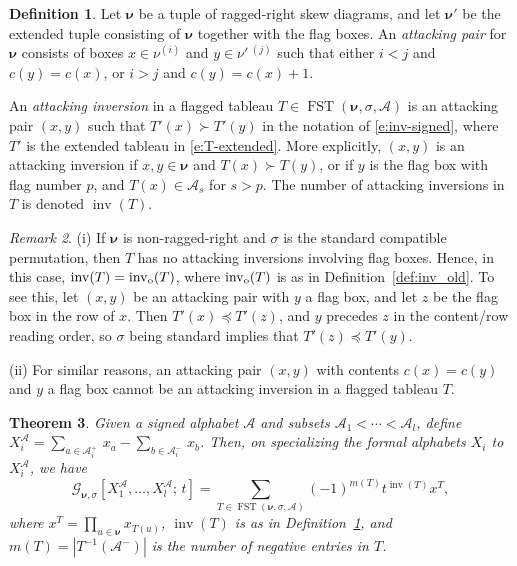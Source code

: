 \documentclass[12pt]{amsart}
\newtheorem{thm}{Theorem}[subsection]
\theoremstyle{definition}
\newtheorem{defn}[thm]{Definition}
\theoremstyle{remark}
\newtheorem{remark}[thm]{Remark}
\newcommand{\nubold}{{\boldsymbol \nu }}
\newcommand{\Acal}{{\mathcal A}}
\newcommand{\Gcal}{{\mathcal G}}
\newcommand{\sgngt}{\succ}
\newcommand{\sgnle}{\preccurlyeq}
\DeclareMathOperator{\inv}{inv}
\newcommand{\oinv}{\inv _{{\rm o}}}
\DeclareMathOperator{\FSST}{FST}
\begin{document}
\begin{defn}\label{def:inversions}
Let $\nubold $ be a tuple of ragged-right skew diagrams, and let
$\nubold '$ be the extended tuple consisting of $\nubold $ together
with the flag boxes.  An {\em attacking pair} for $\nubold $ consists
of boxes $x\in \nu ^{(i)}$ and $y\in \nu '\, ^{(j)}$ such that either
$i<j$ and $c(y) = c(x)$, or $i>j$ and $c(y) = c(x)+1$.


An {\em attacking inversion} in a flagged tableau $T\in \FSST (\nubold
, \sigma ,\Acal )$ is an attacking pair $(x,y)$ such that $T'(x)
\sgngt T'(y)$ in the notation of \eqref{e:inv-signed}, where $T'$ is
the extended tableau in \eqref{e:T-extended}.  More explicitly,
$(x,y)$ is an attacking inversion if $x, y\in \nubold $ and $T(x)
\sgngt T(y)$, or if $y$ is the flag box with flag number $p$, and
$T(x)\in \Acal _{s}$ for $s>p$.  The number of attacking inversions in
$T$ is denoted $\inv (T)$.
\end{defn}

\begin{remark}\label{rem:no-funny-inv}
(i) If $\nubold $ is non-ragged-right and $\sigma $ is the standard
compatible permutation, then $T$ has no attacking inversions involving
flag boxes.  Hence, in this case, $\inv (T) = \oinv (T)$, where $\oinv
(T)$ is as in Definition~\ref{def:inv_old}.  To see this, let $(x,y)$
be an attacking pair with $y$ a flag box, and let $z$ be the flag box
in the row of $x$.  Then $T'(x)\sgnle T'(z)$, and $y$ precedes $z$ in
the content/row reading order, so $\sigma $ being standard implies
that $T'(z)\sgnle T'(y)$.

(ii) For similar reasons, an attacking pair $(x,y)$ with contents
$c(x)=c(y)$ and $y$ a flag box cannot be an attacking inversion in a
flagged tableau $T$.
\end{remark}

\begin{thm}\label{thm:combinatorial-G-nu-sigma}
Given a signed alphabet $\Acal $ and subsets $\Acal _{1}<\cdots <\Acal
_{l}$, define $X_{i}^\Acal = \sum _{a\in \Acal _{i}^{+}}\, x_{a} -
\sum _{b\in \Acal _{i}^{-}}\, x_{b}$.  Then, on specializing the
formal alphabets $X_i$ to $X^\Acal _i$, we have
\begin{equation}\label{e:combinatorial-G-nu-sigma}
\Gcal _{\nubold ,\sigma }[X^\Acal_{1}, \ldots, X^\Acal_{l};\, t] = \sum _{T\in
\FSST (\nubold , \sigma , \Acal )} (-1)^{m(T)} t^{\inv (T)} x^{T},
\end{equation}
where $x^{T} = \prod _{u\in \nubold } x_{T(u)}$, $\inv (T)$ is as in
Definition~\ref{def:inversions}, and $m(T) = |T^{-1}(\Acal ^{-})|$ is
the number of negative entries in $T$.
\end{thm}
\end{document}
